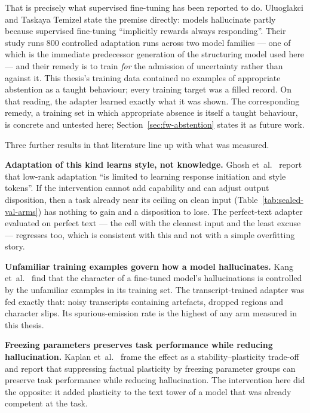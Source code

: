 That is precisely what supervised fine-tuning has been reported to do.
Uluoglakci and Taskaya Temizel \parencite{uluoglakci2026humility} state the premise directly: models hallucinate partly
because supervised fine-tuning ``implicitly rewards always responding''. Their study runs 800
controlled adaptation runs across two model families --- one of which is the immediate
predecessor generation of the structuring model used here --- and their remedy is to train
\emph{for} the admission of uncertainty rather than against it. This thesis's training data
contained no examples of appropriate abstention as a taught behaviour; every training target was
a filled record. On that reading, the adapter learned exactly what it was shown. The
corresponding remedy, a training set in which appropriate absence is itself a taught
behaviour, is concrete and untested here; Section~\ref{sec:fw-abstention} states it as
future work.

Three further results in that literature line up with what was measured.

\textbf{Adaptation of this kind learns style, not knowledge.} Ghosh et~al.\ \parencite{ghosh2024limitations}
report that low-rank adaptation ``is limited to learning response initiation and style
tokens''. If the intervention cannot add capability and can adjust output
disposition, then a task already near its ceiling on clean input
(Table~\ref{tab:sealed-val-arms}) has nothing to gain and a disposition to lose. The perfect-text
adapter evaluated on perfect text --- the cell with the cleanest input and the least excuse ---
regresses too, which is consistent with this and not with a simple overfitting story.

\textbf{Unfamiliar training examples govern how a model hallucinates.}
Kang et~al.\ \parencite{kang2024unfamiliar} find that the character of a fine-tuned model's hallucinations
is controlled by the unfamiliar examples in its training set. The transcript-trained adapter was fed exactly
that: noisy transcripts containing artefacts, dropped regions and character slips. Its
spurious-emission rate is the highest of any arm measured in this thesis.

\textbf{Freezing parameters preserves task performance while reducing hallucination.}
Kaplan et~al.\ \parencite{kaplan2026why} frame the effect as a stability--plasticity trade-off and report
that suppressing factual plasticity by freezing parameter groups can preserve task
performance while reducing hallucination. The intervention here did the opposite: it added plasticity
to the text tower of a model that was already competent at the task.

